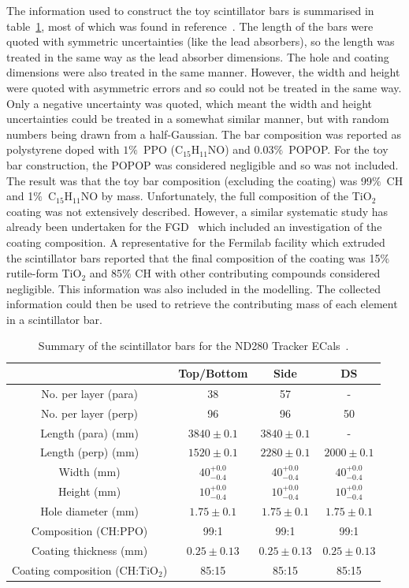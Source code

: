 \label{subsubsec:ECalMassSctintillatorBars}
The information used to construct the toy scintillator bars is summarised in table~\ref{table:ScintillatorBarDimensions}, most of which was found in reference~\cite{1748-0221-8-10-P10019}.  The length of the bars were quoted with symmetric uncertainties (like the lead absorbers), so the length was treated in the same way as the lead absorber dimensions.  The hole and coating dimensions were also treated in the same manner.  However, the width and height were quoted with asymmetric errors and so could not be treated in the same way.  Only a negative uncertainty was quoted, which meant the width and height uncertainties could be treated in a somewhat similar manner, but with random numbers being drawn from a half-Gaussian.  The bar composition was reported as polystyrene doped with $1\%$~PPO (C$_{15}$H$_{11}$NO) and $0.03\%$~POPOP.  For the toy bar construction, the POPOP was considered negligible and so was not included.  The result was that the toy bar composition (excluding the coating) was 99$\%$~CH and 1$\%$~C$_{15}$H$_{11}$NO by mass.  Unfortunately, the full composition of the TiO$_2$ coating was not extensively described.  However, a similar systematic study has already been undertaken for the FGD~\cite{FGDMassTN} which included an investigation of the coating composition.  A representative for the Fermilab facility which extruded the scintillator bars reported that the final composition of the coating was 15$\%$ rutile-form TiO$_2$ and 85$\%$ CH with other contributing compounds considered negligible.  This information was also included in the modelling.  The collected information could then be used to retrieve the contributing mass of each element in a scintillator bar.
\begin{table}[t!]
  \begin{tabular}{ c c c c }
     & Top/Bottom & Side & DS \\ \hline \hline
  No. per layer (para) & 38 & 57 & - \\
  No. per layer (perp) & 96 & 96 & 50 \\
  Length (para) (mm) & $3840\pm0.1$ & $3840\pm0.1$ & - \\
  Length (perp) (mm) & $1520\pm0.1$ & $2280\pm0.1$ & $2000\pm0.1$ \\
  Width (mm) & $40^{+0.0}_{-0.4}$ & $40^{+0.0}_{-0.4}$& $40^{+0.0}_{-0.4}$ \\
  Height (mm) & $10^{+0.0}_{-0.4}$ & $10^{+0.0}_{-0.4}$& $10^{+0.0}_{-0.4}$ \\
  Hole diameter (mm) & $1.75\pm0.1$ & $1.75\pm0.1$ & $1.75\pm0.1$ \\
  Composition (CH:PPO) & 99:1 & 99:1 & 99:1 \\
  Coating thickness (mm) & $0.25\pm0.13$ & $0.25\pm0.13$ & $0.25\pm0.13$ \\
  Coating composition (CH:TiO$_2$) & 85:15 & 85:15 & 85:15 \\
  \end{tabular}
  \caption{Summary of the scintillator bars for the ND280 Tracker ECals~\cite{1748-0221-8-10-P10019}.}
  \label{table:ScintillatorBarDimensions}
\end{table}


